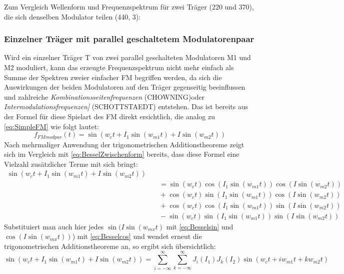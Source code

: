 Zum Vergleich Wellenform und Frequenzspektrum für zwei Träger (220 und 370), die sich denselben Modulator teilen (440, 3):

\subsubsection{Einzelner Träger mit parallel geschaltetem Modulatorenpaar}

Wird ein einzelner Träger T von zwei parallel geschalteten Modulatoren M1 und M2 moduliert, kann das erzeugte Frequenzspektrum nicht mehr einfach als Summe der Spektren zweier einfacher FM begriffen werden, da sich die Auswirkungen der beiden Modulatoren auf den Träger gegenseitig beeinflussen und zahlreiche \textit{Kombinationsseitenfrequenzen} (CHOWNING)oder \textit{Intermodulationsfrequenzen]} (SCHOTTSTAEDT) entstehen. Das ist bereits aus der Formel für diese Spielart des FM direkt ersichtlich, die analog zu \ref{eq:SimpleFM} wie folgt lautet:
\begin{equation}
f_{FMmodpar}(t) = \sin(w_ct + I_1\sin(w_{m1}t) + I\sin(w_{m2}t))
\end{equation}
Nach mehrmaliger Anwendung der trigonometrischen Additionstheoreme zeigt sich im Vergleich mit \ref{eq:BesselZwischenform} bereits, dass diese Formel eine Vielzahl zusätzlicher Terme mit sich bringt:
\begin{equation}
\begin{split}
\sin(w_ct + I_1\sin(w_{m1}t) + I\sin(w_{m2}t)) \\ &\quad = \sin(w_ct)\cos(I_1\sin(w_{m1}t))\cos(I\sin(w_{m2}t)) \\ &\quad + \cos(w_ct)\sin(I_1\sin(w_{m1}t))\cos(I\sin(w_{m2}t)) \\ &\quad +\cos(w_ct)\cos(I_1\sin(w_{m1}t))\sin(I\sin(w_{m2}t)) \\ &\quad -\sin(w_ct)\sin(I_1\sin(w_{m1}t))\sin(I\sin(w_{m2}t))
\end{split}
\end{equation}
Substituiert man auch hier jedes \begin{math} \sin(I\sin(w_{mx}t) \end{math} mit \ref{eq:Besselsin} und \begin{math} \cos(I\sin(w_{mx}t)) \end{math}) mit \ref{eq:Besselcos} und wendet erneut die trigonometrischen Additionstheoreme an, so ergibt sich übersichtlich:
\begin{equation}\label{eq:ParallelKompakt}
\sin(w_ct + I_1\sin(w_{m1}t) + I\sin(w_{m2}t)) = \sum_{i=-\infty}^{\infty}\sum_{k=-\infty}^{\infty}J_i(I_1)J_k(I_2)\sin(w_ct + iw_{m1}t + kw_{m2}t)
\end{equation}

